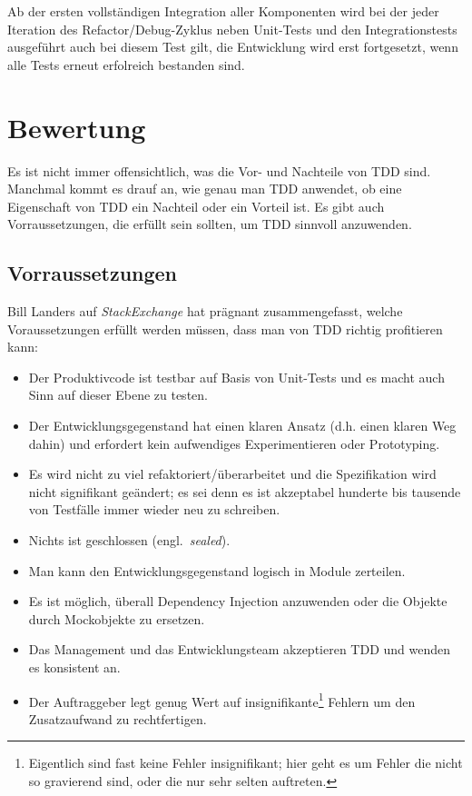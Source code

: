 \documentclass[a4paper,10pt]{scrartcl}
\newcommand{\pje}{\marginpar{Philipp\\Jeske}}
\newcommand{\bmn}{\marginpar{Benjamin\\Morgan}}
\begin{document}
Ab der ersten vollständigen Integration aller Komponenten wird bei der jeder
Iteration des Refactor/Debug-Zyklus neben Unit-Tests und den Integrationstests
ausgeführt auch bei diesem Test gilt, die Entwicklung wird erst fortgesetzt,
wenn alle Tests erneut erfolreich bestanden sind.


\section{Bewertung}\label{cpt:Bewertung}\bmn
Es ist nicht immer offensichtlich, was die Vor- und Nachteile von TDD sind. Manchmal
kommt es drauf an, wie genau man TDD anwendet, ob eine Eigenschaft von TDD
ein Nachteil oder ein Vorteil ist. Es gibt auch Vorraussetzungen, die erfüllt
sein sollten, um TDD sinnvoll anzuwenden.

\subsection{Vorraussetzungen}\label{sec:Vorraussetzungen}
Bill Landers auf \emph{StackExchange} \cite{StackExchange} hat prägnant
zusammengefasst, welche Voraussetzungen erfüllt werden müssen, dass man von TDD
richtig profitieren kann:

\begin{itemize}
    \item Der Produktivcode ist testbar auf Basis von Unit-Tests und es macht auch
        Sinn auf dieser Ebene zu testen.
    \item Der Entwicklungsgegenstand hat einen klaren Ansatz (d.h. einen klaren
        Weg dahin) und erfordert kein aufwendiges Experimentieren oder
        Prototyping.
    \item Es wird nicht zu viel refaktoriert/überarbeitet und die Spezifikation
        wird nicht signifikant geändert; es sei denn es ist akzeptabel hunderte
        bis tausende von Testfälle immer wieder neu zu schreiben.
    \item Nichts ist geschlossen (engl.\ \emph{sealed}).
    \item Man kann den Entwicklungsgegenstand logisch in Module zerteilen.
    \item Es ist möglich, überall Dependency Injection anzuwenden oder die
        Objekte durch Mockobjekte zu ersetzen.
    \item Das Management und das Entwicklungsteam akzeptieren TDD und wenden es
        konsistent an.
    \item Der Auftraggeber legt genug Wert auf insignifikante\footnote{Eigentlich
        sind fast keine Fehler insignifikant; hier geht es um Fehler die nicht
        so gravierend sind, oder die nur sehr selten auftreten.} Fehlern um den
        Zusatzaufwand zu rechtfertigen.
\end{itemize}
\end{document}
